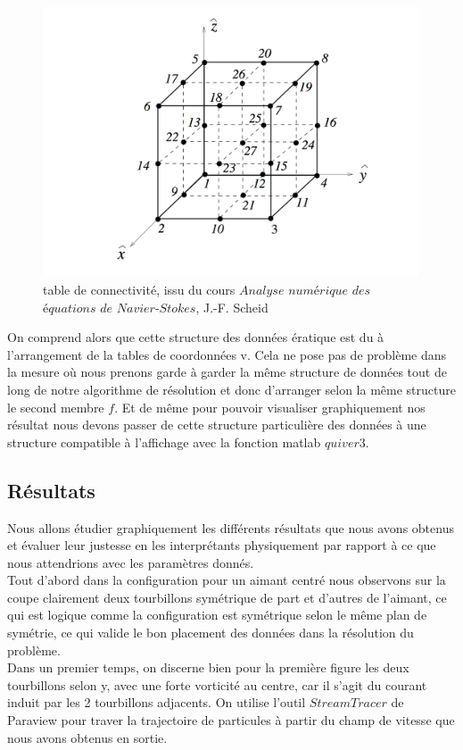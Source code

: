 \documentclass[a4paper,12pt,titlepage]{report}
\begin{document}
\begin{onehalfspace}
\begin{figure}[h]
\center
\includegraphics[height = 8cm, keepaspectratio]{graphes/table_de_connectivite.png} 
\caption{\label{figure 38 } table de connectivité, issu du cours $Analyse$ $numérique$ $des$ $équations$ $de$ $Navier$-$Stokes$, J.-F. Scheid}
\end{figure}
On comprend alors que cette structure des données ératique est du à l'arrangement de la tables de coordonnées v. Cela ne pose pas de problème dans la mesure où nous prenons garde à garder la même structure de données tout de long de notre algorithme de résolution et donc d'arranger selon la même structure le second membre $f$.
Et de même pour pouvoir visualiser graphiquement nos résultat nous devons passer de cette structure particulière des données à une structure compatible à l'affichage avec la fonction matlab $quiver3$.
 
\newpage
\subsection{Résultats}
Nous allons étudier graphiquement les différents résultats que nous avons obtenus et évaluer leur justesse en les interprétants physiquement par rapport à ce que nous attendrions avec les paramètres donnés.
\newline
\\
Tout d'abord dans la configuration pour un aimant centré nous observons sur la coupe clairement deux tourbillons symétrique de part et d'autres de l'aimant, ce qui est logique comme la configuration est symétrique selon le même plan de symétrie, ce qui valide le bon placement des données dans la résolution du problème.
\\
Dans un premier temps, on discerne bien pour la première figure les deux tourbillons selon y, avec une forte vorticité au centre, car il s'agit du courant induit par les 2 tourbillons adjacents.
On utilise l'outil $StreamTracer$ de Paraview pour traver la trajectoire de particules à partir du champ de vitesse que nous avons obtenus en sortie.


\end{onehalfspace}
\end{document}
